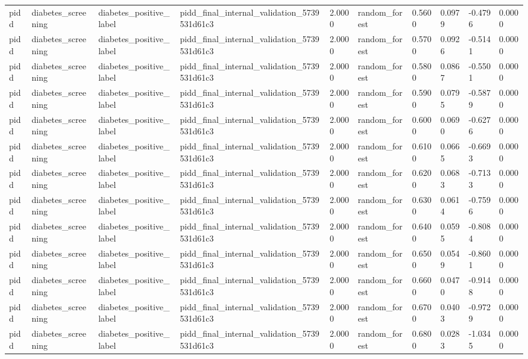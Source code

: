 \begin{tabular}{llllllllll}
pidd & diabetes\_screening & diabetes\_positive\_label & pidd\_final\_internal\_validation\_5739531d61c3 & 2.0000 & random\_forest & 0.5600 & 0.0979 & -0.4796 & 0.0000 \\
pidd & diabetes\_screening & diabetes\_positive\_label & pidd\_final\_internal\_validation\_5739531d61c3 & 2.0000 & random\_forest & 0.5700 & 0.0926 & -0.5141 & 0.0000 \\
pidd & diabetes\_screening & diabetes\_positive\_label & pidd\_final\_internal\_validation\_5739531d61c3 & 2.0000 & random\_forest & 0.5800 & 0.0867 & -0.5501 & 0.0000 \\
pidd & diabetes\_screening & diabetes\_positive\_label & pidd\_final\_internal\_validation\_5739531d61c3 & 2.0000 & random\_forest & 0.5900 & 0.0795 & -0.5879 & 0.0000 \\
pidd & diabetes\_screening & diabetes\_positive\_label & pidd\_final\_internal\_validation\_5739531d61c3 & 2.0000 & random\_forest & 0.6000 & 0.0690 & -0.6276 & 0.0000 \\
pidd & diabetes\_screening & diabetes\_positive\_label & pidd\_final\_internal\_validation\_5739531d61c3 & 2.0000 & random\_forest & 0.6100 & 0.0665 & -0.6693 & 0.0000 \\
pidd & diabetes\_screening & diabetes\_positive\_label & pidd\_final\_internal\_validation\_5739531d61c3 & 2.0000 & random\_forest & 0.6200 & 0.0683 & -0.7133 & 0.0000 \\
pidd & diabetes\_screening & diabetes\_positive\_label & pidd\_final\_internal\_validation\_5739531d61c3 & 2.0000 & random\_forest & 0.6300 & 0.0614 & -0.7596 & 0.0000 \\
pidd & diabetes\_screening & diabetes\_positive\_label & pidd\_final\_internal\_validation\_5739531d61c3 & 2.0000 & random\_forest & 0.6400 & 0.0595 & -0.8084 & 0.0000 \\
pidd & diabetes\_screening & diabetes\_positive\_label & pidd\_final\_internal\_validation\_5739531d61c3 & 2.0000 & random\_forest & 0.6500 & 0.0549 & -0.8601 & 0.0000 \\
pidd & diabetes\_screening & diabetes\_positive\_label & pidd\_final\_internal\_validation\_5739531d61c3 & 2.0000 & random\_forest & 0.6600 & 0.0470 & -0.9148 & 0.0000 \\
pidd & diabetes\_screening & diabetes\_positive\_label & pidd\_final\_internal\_validation\_5739531d61c3 & 2.0000 & random\_forest & 0.6700 & 0.0403 & -0.9729 & 0.0000 \\
pidd & diabetes\_screening & diabetes\_positive\_label & pidd\_final\_internal\_validation\_5739531d61c3 & 2.0000 & random\_forest & 0.6800 & 0.0283 & -1.0345 & 0.0000 \\

\end{tabular}
